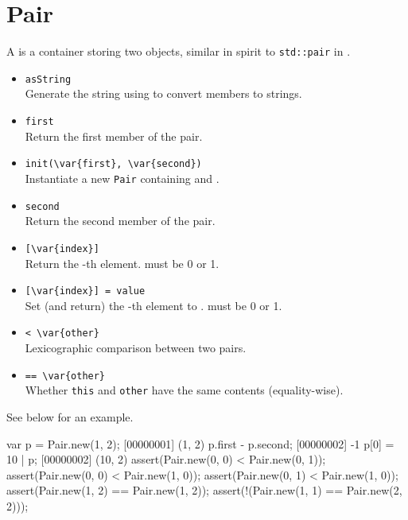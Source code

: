 \section{Pair}

A  is a container storing two objects, similar in spirit to
\lstinline|std::pair| in \Cxx.


\begin{itemize}
\item \lstinline|asString|\\
  Generate the string  using
   to convert members to strings.

\item \lstinline|first|\\
  Return the first member of the pair.

\item \lstinline|init(\var{first}, \var{second})|~\\
  Instantiate a new \lstinline|Pair| containing  and
  .

\item \lstinline|second|\\
  Return the second member of the pair.

\item \lstinline|[\var{index}]|\\
  Return the -th element.   must be 0 or 1.

\item \lstinline|[\var{index}] = value|\\
  Set (and return) the -th element to .
   must be 0 or 1.

\item \lstinline|< \var{other}|\\
  Lexicographic comparison between two pairs.

\item \lstinline|== \var{other}|\\
  Whether \lstinline|this| and \lstinline|other| have the same
  contents (equality-wise).
\end{itemize}

See below for an example.

\begin{urbiscript}
var p = Pair.new(1, 2);
[00000001] (1, 2)
p.first - p.second;
[00000002] -1
p[0] = 10 | p;
[00000002] (10, 2)
assert(Pair.new(0, 0) < Pair.new(0, 1));
assert(Pair.new(0, 0) < Pair.new(1, 0));
assert(Pair.new(0, 1) < Pair.new(1, 0));
assert(Pair.new(1, 2) == Pair.new(1, 2));
assert(!(Pair.new(1, 1) == Pair.new(2, 2)));
\end{urbiscript}


